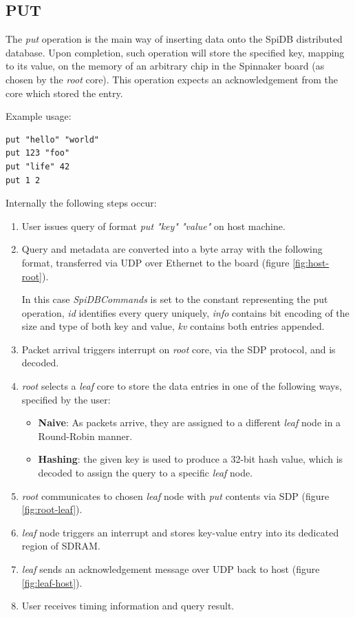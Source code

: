 \subsection{PUT}
The \textit{put} operation is the main way of inserting data onto the SpiDB distributed database. 
Upon completion, such operation will store the specified key, mapping to its value, on the memory of an arbitrary chip in the Spinnaker board (as chosen by the \textit{root} core). This operation expects an acknowledgement from the core which stored the entry.

Example usage:
\begin{lstlisting}
put "hello" "world"
put 123 "foo"
put "life" 42
put 1 2
\end{lstlisting}
 
Internally the following steps occur:
\begin{enumerate}
\item User issues query of format \textit{put "key" "value"} on host machine.
\item Query and metadata are converted into a byte array with the following format, transferred via UDP over Ethernet to the board (figure \ref{fig:host-root}).

In this case \textit{SpiDBCommands} is set to the constant representing the put operation, \textit{id} identifies every query uniquely, \textit{info} contains bit encoding of the size and type of both key and value, \textit{k\textunderscore v} contains both entries appended.
\item Packet arrival triggers interrupt on \textit{root} core, via the SDP protocol, and is decoded.
\item \textit{root} selects a \textit{leaf} core to store the data entries in one of the following ways, specified by the user:
\begin{itemize}
	\item \textbf{Naive}: As packets arrive, they are assigned to a different \textit{leaf} node in a Round-Robin manner.
	\item \textbf{Hashing}: the given key is used to produce a 32-bit hash value, which is decoded to assign the query to a specific \textit{leaf} node.
\end{itemize}
\item \textit{root} communicates to chosen \textit{leaf} node with \textit{put} contents via SDP (figure \ref{fig:root-leaf}).
\item \textit{leaf} node triggers an interrupt and stores key-value entry into its dedicated region of SDRAM.
\item \textit{leaf} sends an acknowledgement message over UDP back to host (figure \ref{fig:leaf-host}).
\item User receives timing information and query result.
\end{enumerate}


